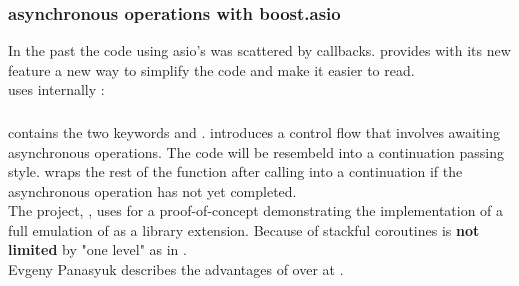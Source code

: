 \subsubsection*{asynchronous operations with boost.asio}
In the past the code using asio's \asyncops was scattered by callbacks.
\boostasio provides with its new \asyncres feature a new way to simplify the
code and make it easier to read.\\
\yieldcontext uses internally \boostcoroutine:

\subsubsection*{\csharp \await}
\csharp contains the two keywords \async and \await. \async introduces a control
flow that involves awaiting asynchronous operations. The code will be resembeld
into a continuation passing style. \await wraps the rest of the function after
calling \await into a continuation if the asynchronous operation has not yet
completed.\\
The project, \awaitemu, uses \boostcoroutine for a proof-of-concept
demonstrating the implementation of a full emulation of \csharp \await as a
library extension. Because of stackful coroutines \await is \textbf{not limited}
by "one level" as in \csharp.\\
Evgeny Panasyuk describes the advantages of \boostcoroutine over \await at
\channelnine.
